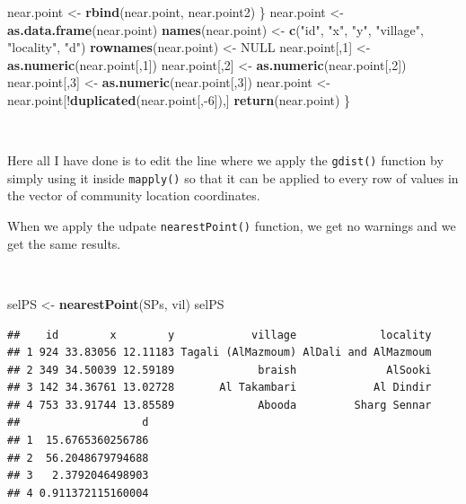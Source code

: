 \documentclass[11pt,a4paper]{article}
\newenvironment{Shaded}{}{}
\newcommand{\KeywordTok}[1]{\textcolor[rgb]{0.00,0.44,0.13}{\textbf{#1}}}
\newcommand{\DecValTok}[1]{\textcolor[rgb]{0.25,0.63,0.44}{#1}}
\newcommand{\StringTok}[1]{\textcolor[rgb]{0.25,0.44,0.63}{#1}}
\newcommand{\OtherTok}[1]{\textcolor[rgb]{0.00,0.44,0.13}{#1}}
\newcommand{\OperatorTok}[1]{\textcolor[rgb]{0.40,0.40,0.40}{#1}}
\newcommand{\NormalTok}[1]{#1}
\begin{document}
\begin{Shaded}
\begin{Highlighting}[]
\NormalTok{      near.point <-}\StringTok{ }\KeywordTok{rbind}\NormalTok{(near.point, near.point2)}
\NormalTok{    \}}
\NormalTok{  near.point <-}\StringTok{ }\KeywordTok{as.data.frame}\NormalTok{(near.point)}
    \KeywordTok{names}\NormalTok{(near.point) <-}\StringTok{ }\KeywordTok{c}\NormalTok{(}\StringTok{"id"}\NormalTok{, }\StringTok{"x"}\NormalTok{, }\StringTok{"y"}\NormalTok{, }\StringTok{"village"}\NormalTok{, }\StringTok{"locality"}\NormalTok{, }\StringTok{"d"}\NormalTok{) }
    \KeywordTok{rownames}\NormalTok{(near.point) <-}\StringTok{ }\OtherTok{NULL}  
\NormalTok{    near.point[,}\DecValTok{1}\NormalTok{] <-}\StringTok{ }\KeywordTok{as.numeric}\NormalTok{(near.point[,}\DecValTok{1}\NormalTok{])}
\NormalTok{    near.point[,}\DecValTok{2}\NormalTok{] <-}\StringTok{ }\KeywordTok{as.numeric}\NormalTok{(near.point[,}\DecValTok{2}\NormalTok{])}
\NormalTok{    near.point[,}\DecValTok{3}\NormalTok{] <-}\StringTok{ }\KeywordTok{as.numeric}\NormalTok{(near.point[,}\DecValTok{3}\NormalTok{]) }
\NormalTok{    near.point <-}\StringTok{ }\NormalTok{near.point[}\OperatorTok{!}\KeywordTok{duplicated}\NormalTok{(near.point[,}\OperatorTok{-}\DecValTok{6}\NormalTok{]),]}
    \KeywordTok{return}\NormalTok{(near.point)}
\NormalTok{\}}
\end{Highlighting}
\end{Shaded}

~

Here all I have done is to edit the line where we apply the
\texttt{gdist()} function by simply using it inside \texttt{mapply()} so
that it can be applied to every row of values in the vector of community
location coordinates.

When we apply the udpate \texttt{nearestPoint()} function, we get no
warnings and we get the same results.

~

\begin{Shaded}
\begin{Highlighting}[]
\NormalTok{selPS <-}\StringTok{ }\KeywordTok{nearestPoint}\NormalTok{(SPs, vil)}
\NormalTok{selPS}
\end{Highlighting}
\end{Shaded}

\begin{verbatim}
##    id        x        y            village             locality
## 1 924 33.83056 12.11183 Tagali (AlMazmoum) AlDali and AlMazmoum
## 2 349 34.50039 12.59189             braish              AlSooki
## 3 142 34.36761 13.02728       Al Takambari            Al Dindir
## 4 753 33.91744 13.85589             Abooda         Sharg Sennar
##                   d
## 1  15.6765360256786
## 2  56.2048679794688
## 3   2.3792046498903
## 4 0.911372115160004
\end{verbatim}
\end{document}
